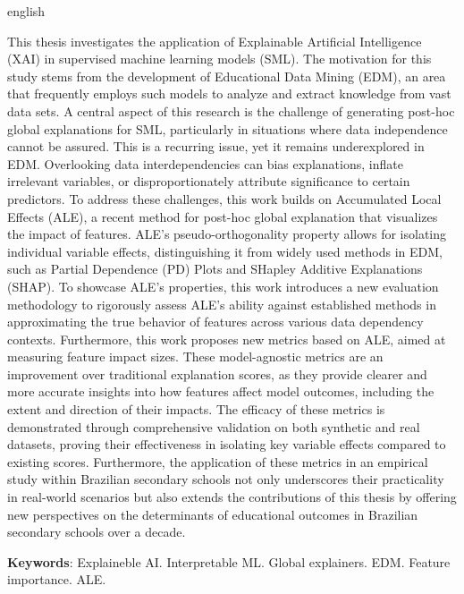 \begin{resumo}[Abstract]
\begin{otherlanguage*}{english}

This thesis investigates the application of Explainable Artificial Intelligence (XAI) in supervised machine learning models (SML). The motivation for this study stems from the development of Educational Data Mining (EDM), an area that frequently employs such models to analyze and extract knowledge from vast data sets. A central aspect of this research is the challenge of generating post-hoc global explanations for SML, particularly in situations where data independence cannot be assured. This is a recurring issue, yet it remains underexplored in EDM. Overlooking data interdependencies can bias explanations, inflate irrelevant variables, or disproportionately attribute significance to certain predictors. To address these challenges, this work builds on Accumulated Local Effects (ALE), a recent method for post-hoc global explanation that visualizes the impact of features. ALE's pseudo-orthogonality property allows for isolating individual variable effects, distinguishing it from widely used methods in EDM, such as Partial Dependence (PD) Plots and SHapley Additive Explanations (SHAP). To showcase ALE's properties, this work introduces a new evaluation methodology to rigorously assess ALE's ability against established methods in approximating the true behavior of features across various data dependency contexts. Furthermore, this work proposes new metrics based on ALE, aimed at measuring feature impact sizes. These model-agnostic metrics are an improvement over traditional explanation scores, as they provide clearer and more accurate insights into how features affect model outcomes, including the extent and direction of their impacts. The efficacy of these metrics is demonstrated through comprehensive validation on both synthetic and real datasets, proving their effectiveness in isolating key variable effects compared to existing scores. Furthermore, the application of these metrics in an empirical study within Brazilian secondary schools not only underscores their practicality in real-world scenarios but also extends the contributions of this thesis by offering new perspectives on the determinants of educational outcomes in Brazilian secondary schools over a decade.

\vspace{\onelineskip} 

\noindent 
\textbf{Keywords}: Explaineble AI. Interpretable ML.  Global explainers. EDM. Feature importance. ALE.
\end{otherlanguage*}
\end{resumo}

